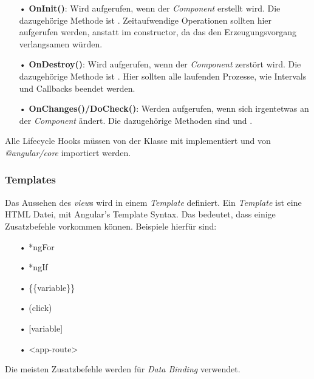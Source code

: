 \begin{itemize}
\item[•] \textbf{OnInit()}: Wird aufgerufen, wenn der \textit{Component} erstellt wird. Die dazugehörige Methode ist . Zeitaufwendige Operationen sollten hier aufgerufen werden, anstatt im constructor, da das den Erzeugungsvorgang verlangsamen würden.
\item[•] \textbf{OnDestroy()}: Wird aufgerufen, wenn der \textit{Component} zerstört wird. Die dazugehörige Methode ist . Hier sollten alle laufenden Prozesse, wie Intervals und Callbacks beendet werden.
\item[•] \textbf{OnChanges()/DoCheck()}: Werden aufgerufen, wenn sich irgentetwas an der \textit{Component} ändert. Die dazugehörige Methoden sind  und .
\end{itemize}

Alle Lifecycle Hooks müssen von der Klasse mit  implementiert und von \textit{@angular/core} importiert werden.

\subsubsection{Templates}
\label{sec:ang-templates}
Das Aussehen des \textit{view}s wird in einem \textit{Template} definiert. Ein \textit{Template} ist eine \ac{HTML} Datei, mit Angular's Template Syntax. Das bedeutet, dass einige Zusatzbefehle vorkommen können. Beispiele hierfür sind:

\begin{itemize}
\item[•]*ngFor
\item[•]*ngIf
\item[•]\{\{variable\}\}
\item[•](click)
\item[•][variable]
\item[•]<app-route>
\end{itemize}

Die meisten Zusatzbefehle werden für \textit{Data Binding} verwendet.

